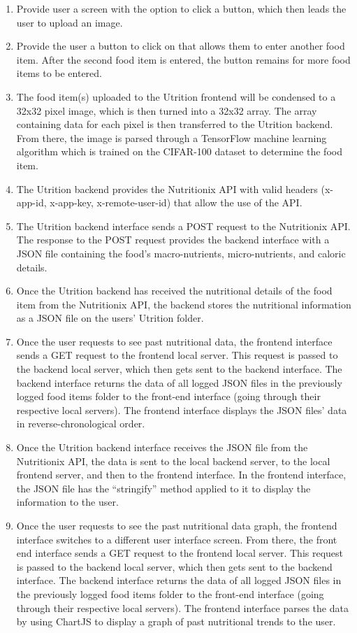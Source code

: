 \documentclass[12pt, titlepage]{article}
\begin{document}
\begin{enumerate}[{FR}1. ]
	\item Provide user a screen with the option to click a button, which then leads the user to upload an image.
	\item Provide the user a button to click on that allows them to enter another food item. After the second food item is entered, the button remains for more food items to be entered.
	\item The food item(s) uploaded to the Utrition frontend will be condensed to a 32x32 pixel image, which is then turned into a 32x32 array. The array containing data for each pixel is then transferred to the Utrition backend. From there, the image is parsed through a TensorFlow machine learning algorithm which is trained on the CIFAR-100 dataset to determine the food item.
	\item The Utrition backend provides the Nutritionix API with valid headers (x-app-id, x-app-key, x-remote-user-id) that allow the use of the API.
	\item The Utrition backend interface sends a POST request to the Nutritionix API. The response to the POST request provides the backend interface with a JSON file containing the food’s macro-nutrients, micro-nutrients, and caloric details.
	\item Once the Utrition backend has received the nutritional details of the food item from the Nutritionix API, the backend stores the nutritional information as a JSON file on the users’ Utrition folder.
	\item Once the user requests to see past nutritional data, the frontend interface sends a GET request to the frontend local server. This request is passed to the backend local server, which then gets sent to the backend interface. The backend interface returns the data of all logged JSON files in the previously logged food items folder to the front-end interface (going through their respective local servers). The frontend interface displays the JSON files’ data in reverse-chronological order.
	\item Once the Utrition backend interface receives the JSON file from the Nutritionix API, the data is sent to the local backend server, to the local frontend server, and then to the frontend interface. In the frontend interface, the JSON file has the “stringify” method applied to it to display the information to the user.
	\item Once the user requests to see the past nutritional data graph, the frontend interface switches to a different user interface screen. From there, the front end interface sends a GET request to the frontend local server. This request is passed to the backend local server, which then gets sent to the backend interface. The backend interface returns the data of all logged JSON files in the previously logged food items folder to the front-end interface (going through their respective local servers). The frontend interface parses the data by using ChartJS to display a graph of past nutritional trends to the user.
	
	
\end{enumerate}
\end{document}
